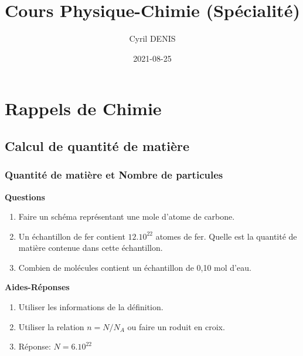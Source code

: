 \documentclass[
]{book}
\title{Cours Physique-Chimie (Spécialité)}
\author{Cyril DENIS}
\date{2021-08-25}
\providecommand{\tightlist}{%
  \setlength{\itemsep}{0pt}\setlength{\parskip}{0pt}}
\def\tightlist{}
\begin{document}
\maketitle

{
\setcounter{tocdepth}{1}
\tableofcontents
}
\hypertarget{rappels-de-chimie}{%
\chapter{Rappels de Chimie}\label{rappels-de-chimie}}

\hypertarget{calcul-de-quantituxe9-de-matiuxe8re}{%
\section{Calcul de quantité de matière}\label{calcul-de-quantituxe9-de-matiuxe8re}}

\hypertarget{quantituxe9-de-matiuxe8re-et-nombre-de-particules}{%
\subsection{Quantité de matière et Nombre de particules}\label{quantituxe9-de-matiuxe8re-et-nombre-de-particules}}

\begin{blackbox}

\begin{center}
\textbf{Questions}

\end{center}

\begin{enumerate}
\def\labelenumi{\arabic{enumi}.}
\tightlist
\item
  Faire un schéma représentant une mole d'atome de carbone.
\item
  Un échantillon de fer contient \(12.10^{22}\) atomes de fer. Quelle est la quantité de matière contenue dans cette échantillon.
\item
  Combien de molécules contient un échantillon de 0,10 mol d'eau.
\end{enumerate}

\end{blackbox}

\textbf{Aides-Réponses}

\begin{enumerate}
\def\labelenumi{\arabic{enumi}.}
\tightlist
\item
  Utiliser les informations de la définition.
\item
  Utiliser la relation \(n=N / N_A\) ou faire un roduit en croix.
\item
  Réponse: \(N=6.10^{22}\)
\end{enumerate}
\end{document}
